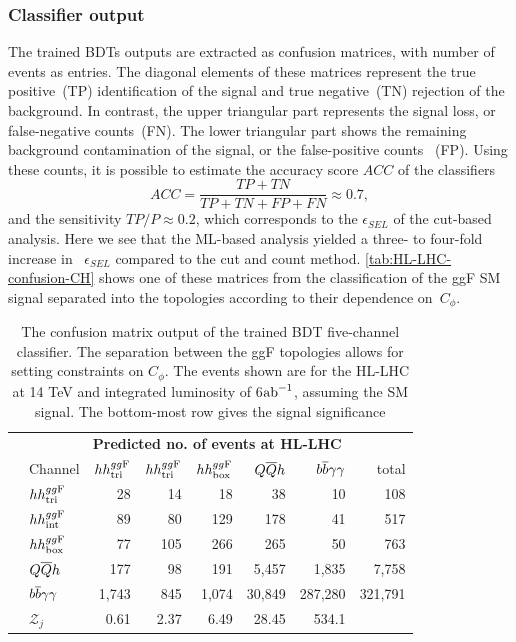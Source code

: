 \subsubsection*{Classifier output}
\par The trained BDTs outputs are extracted as confusion matrices,  with number of events as entries. The diagonal elements of these matrices represent the true positive~(TP) identification of the signal and true negative~(TN) rejection of the background. In contrast, the upper triangular part represents the signal loss, or false-negative counts~(FN). The lower triangular part shows the remaining background contamination of the signal, or the false-positive counts ~(FP). Using these counts, it is possible to estimate the accuracy score $ACC$ of the classifiers
\begin{equation}
	ACC = \frac{TP+TN}{TP+TN+FP+FN} \approx 0.7,
\end{equation}
and the sensitivity $ TP/P \approx 0.2$, which corresponds to the $\epsilon_{SEL}$ of the cut-based analysis. Here we see that the ML-based analysis yielded a three- to four-fold increase in~ $\epsilon_{SEL}$ compared to the cut and count method. \autoref{tab:HL-LHC-confusion-CH} shows one of these matrices from the classification of the ggF SM signal separated into the topologies according to their dependence on~$C_\phi$. 
\begin{table}[]
	\centering
	{\footnotesize
		\begin{tabular}{ll|rrrrr|r}
			\multirow{7}{*}{\rb{\bf \footnotesize Actual no. of events\hspace{0.45cm}}} & \multicolumn{7}{c}{\bf Predicted no. of events at HL-LHC}\\
			\cmidrule[\heavyrulewidth]{2-8}
			& Channel & $hh^{gg\rm F}_{\rm tri}$ & $hh^{gg\rm F}_{\rm tri}$ &  $hh^{gg\rm F}_{\rm box}$&      $Q\overline Q h$ & $b\overline b\gamma\gamma$ &   total \\
			\cline{2-8}
			&$hh^{gg\rm F}_{\rm tri}$         &   28 &	14 &	18&	38&	10&	108 \\
			&$hh^{gg\rm F}_{\rm int}$         &   	89&	80&	129&	178&	41&	517\\
			&$hh^{gg\rm F}_{\rm box}$         &   77&	105&	266&	265&	50&	763 \\
			&$Q\overline Q h$           &  177&	98&	191&	5,457&	1,835& 7,758 \\
			&$b\overline b\gamma\gamma$          & 1,743&	845&	1,074& 30,849&	287,280&	321,791 \\
				\cline{2-8}
				&$\mathcal{Z}_j$& 0.61&	2.37&	6.49&	28.45&	534.1	&       \\
			\cmidrule[\heavyrulewidth]{2-8}
		\end{tabular}
	} 
	\caption{The confusion matrix output of the trained BDT  five-channel classifier. The separation between the ggF topologies allows for setting constraints on $C_\phi$. The events shown are for the HL-LHC at 14 TeV and integrated luminosity of 6$\text{ab}^{-1}$, assuming the SM signal. The bottom-most row gives the signal significance}
	\label{tab:HL-LHC-confusion-CH}
\end{table}
